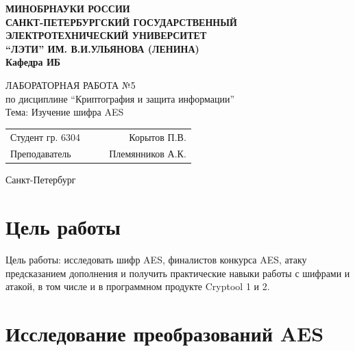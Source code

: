 \documentclass[a4paper, 14pt]{extarticle}
\begin{document}
\begin{titlepage}
    \centering
    {\bfseries
        \uppercase{
            Минобрнауки России \\
            Санкт-Петербургский государственный \\
            Электротехнический университет \\
            \enquote{ЛЭТИ} им. В.И.Ульянова (Ленина)\\
        }
        Кафедра ИБ

        \vspace{\fill}
        \uppercase{Лабораторная работа №5} \\
        по дисциплине \enquote{Криптография и защита информации} \\
        Тема: Изучение шифра AES
    }

    \vspace{\fill}
    \begin{tabularx}{0.8\textwidth}{l X c r}
        Студент гр. 6304 & & \underline{\hspace{3cm}} & Корытов П.В.\\
        Преподаватель & & \underline{\hspace{3cm}} & Племянников А.К.
    \end{tabularx}

    \vspace{1cm}
    Санкт-Петербург \\
    \the\year{}
\end{titlepage}

\newpage

\section*{Цель работы}
Цель работы: исследовать шифр AES, финалистов конкурса AES, атаку предсказанием дополнения и получить практические навыки работы с шифрами и атакой, в том числе и в программном продукте Cryptool 1 и 2.

\section{Исследование преобразований AES}
\end{document}
